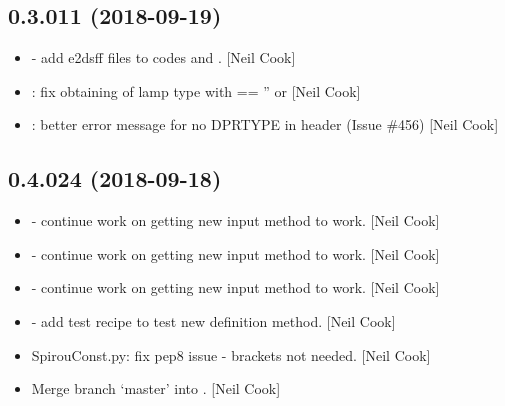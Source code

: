 \documentclass[a4paper,10pt,english]{report}
\begin{document}
\subsection{0.3.011 (2018-09-19)}
\label{\detokenize{misc/changelog:id319}}\begin{itemize}
\item {} 
 - add e2dsff files to  codes and .
{[}Neil Cook{]}

\item {} 
: fix obtaining of lamp type with 
 == ” or  {[}Neil Cook{]}

\item {} 
: better error message for no DPRTYPE in
header (Issue \#456) {[}Neil Cook{]}

\end{itemize}


\subsection{0.4.024 (2018-09-18)}
\label{\detokenize{misc/changelog:id320}}\begin{itemize}
\item {} 
 - continue work on getting new input method to work.
{[}Neil Cook{]}

\item {} 
 - continue work on getting new input method to work.
{[}Neil Cook{]}

\item {} 
 - continue work on getting new input method to work.
{[}Neil Cook{]}

\item {} 
 - add test recipe to test new definition method. {[}Neil
Cook{]}

\item {} 
SpirouConst.py: fix pep8 issue - brackets not needed. {[}Neil Cook{]}

\item {} 
Merge branch ‘master’ into . {[}Neil Cook{]}

\end{itemize}
\end{document}
